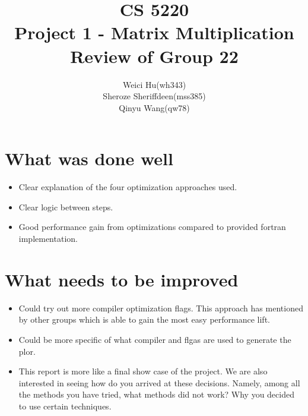 \documentclass[11pt]{article}
\theoremstyle{plain}
\theoremstyle{definition}
\begin{document}
\title{CS 5220\\ Project 1 - Matrix Multiplication Review of Group 22}
\author{Weici Hu(wh343)\\ Sheroze Sheriffdeen(mss385)\\ Qinyu Wang(qw78)}
\maketitle

\section*{What was done well}
\begin{itemize}
	\item Clear explanation of the four optimization approaches used.
	\item Clear logic between steps. 
	\item Good performance gain from optimizations compared to provided fortran implementation.
\end{itemize}
\section*{What needs to be improved}
\begin{itemize}
	\item Could try out more compiler optimization flags. This approach has mentioned by other groups which is able to gain the most easy performance lift. 
	\item Could be more specific of what compiler and flgas are used to generate the plor.
	\item This report is more like a final show case of the project. We are also interested in seeing how do you arrived at these decisions. Namely, among all the methods you have tried, what methods did not work? Why you decided to use certain techniques.	
\end{itemize}



 
 
\end{document}
